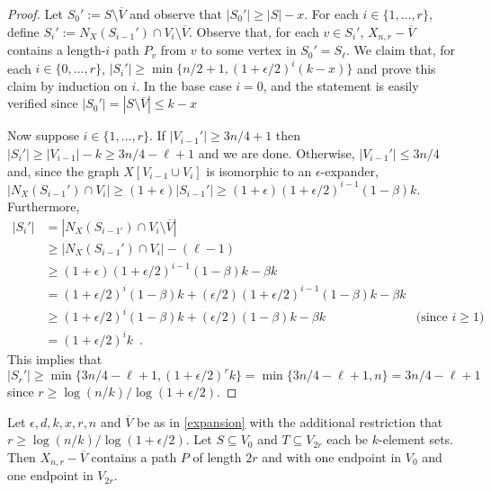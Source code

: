 \documentclass{patmorin}
\begin{document}
\begin{proof}
  Let $S_0':= S\setminus\overline{V}$ and observe that $|S_0'|\ge |S|-x$.  For each $i\in\{1,\ldots,r\}$, define
  $S_i':=N_X(S_{i-1}')\cap V_i\setminus \overline{V}$.
  Observe that, for each $v\in S_i'$, $X_{n,r}-\overline{V}$ contains a length-$i$ path $P_v$ from $v$ to some vertex in $S_0'=S_{\ell}$.  We claim that, for each $i\in\{0,\ldots,r\}$,
  $|S_i'|\ge \min\{n/2+1,(1+\epsilon/2)^i(k-x)\}$
  and prove this claim by induction on $i$.  In the base case $i=0$, and the statement is easily verified since $|S_0'|=|S\setminus\overline{V}|\le k-x$


  Now suppose $i\in\{1,\ldots,r\}$.  If $|V_{i-1}'|\ge 3n/4+1$ then $|S_i'|\ge |V_{i-1}|-k\ge 3n/4-\ell+1$ and we are done.  Otherwise, $|V_{i-1}'|\le 3n/4$ and, since the graph $X[V_{i-1}\cup V_i]$ is isomorphic to an $\epsilon$-expander,  $|N_X(S_{i-1}')\cap V_i| \ge (1+\epsilon)|S_{i-1}'|\ge (1+\epsilon)(1+\epsilon/2)^{i-1}(1-\beta)k$.  Furthermore,
  \begin{align*}
    |S_i'| & = |N_X(S_{i-1'})\cap V_i\setminus \overline{V}| \\
      & \ge |N_X(S_{i-1}')\cap V_i|-(\ell-1) \\
      & \ge (1+\epsilon)(1+\epsilon/2)^{i-1}(1-\beta)k-\beta k \\
      & = (1+\epsilon/2)^i(1-\beta)k + (\epsilon/2)(1+\epsilon/2)^{i-1}(1-\beta) k - \beta k \\
      & \ge (1+\epsilon/2)^i(1-\beta)k + (\epsilon/2)(1-\beta) k - \beta k
       & \text{(since $i\ge 1$)} \\
      & = (1+\epsilon/2)^ik \enspace .
  \end{align*}
  This implies that
  \[
    |S_r'|\ge \min\{3n/4-\ell+1,(1+\epsilon/2)^rk\} = \min\{3n/4-\ell+1,n\} = 3n/4-\ell+1
  \]
  since $r\ge \log(n/k)/\log(1+\epsilon/2)$.
\end{proof}

\begin{lem}\label{one_path}
  Let $\epsilon, d, k, x, r, n$ and $\overline{V}$ be as in \cref{expansion} with the additional restriction that $r\ge\log(n/k)/\log(1+\epsilon/2)$. Let $S\subseteq V_0$ and $T\subseteq V_{2r}$ each be $k$-element sets.  Then $X_{n,r}-\overline{V}$ contains a path $P$ of length $2r$ and with one endpoint in $V_0$ and one endpoint in $V_{2r}$.
\end{lem}
\end{document}
